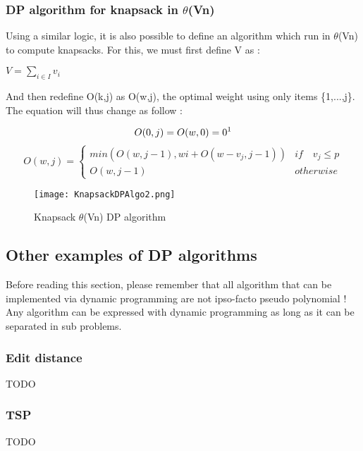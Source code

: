 \subsubsection{DP algorithm for knapsack in $\theta$(Vn)}

Using a similar logic, it is also possible to define an algorithm which run in 
$\theta$(Vn) to compute knapsacks. For this, we must first define V as :\newline

\begin{center}
\Large{$V = \sum_{i \in I} v_i$}
\end{center}

And then redefine O(k,j) as O(w,j), the optimal weight using only items \{1,...,j\}. The equation will thus change as follow :

\[ O(0,j) = O(w,0) = 0 \text{\footnotemark} \]
\[ O(w,j) = \begin{cases}
      min(O(w,j-1), wi + O(w-v_j,j-1)) & if \quad v_j \leq p \\
      O(w,j-1) & otherwise
   \end{cases}
\]

\begin{figure}[!ht]
    \centering
    \texttt{[image: KnapsackDPAlgo2.png]}
    \caption{Knapsack $\theta$(Vn) DP algorithm}
    \label{fig:Knapsack_example}
\end{figure}
\FloatBarrier

\subsection{Other examples of DP algorithms}

Before reading this section, please remember that all algorithm that can be
implemented via dynamic programming are not ipso-facto pseudo polynomial ! Any
algorithm can be expressed with dynamic programming as long as it can be separated in
sub problems.

\subsubsection{Edit distance}

TODO

\subsubsection{TSP}
 
TODO